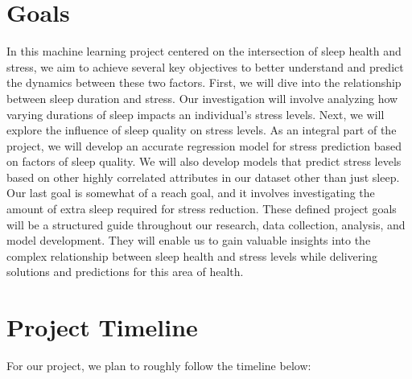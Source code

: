 \documentclass[11pt, letterpaper]{article}
\begin{document}
    \section*{Goals}
    In this machine learning project centered on the intersection of sleep health and 
    stress, we aim to achieve several key objectives to better understand and predict 
    the dynamics between these two factors. First, we will dive into the relationship 
    between sleep duration and stress. Our investigation will involve analyzing how 
    varying durations of sleep impacts an individual's stress levels. Next, we will 
    explore the influence of sleep quality on stress levels. As an integral part of the 
    project, we will develop an accurate regression model for stress prediction based 
    on factors of sleep quality. We will also develop models that predict stress levels 
    based on other highly correlated attributes in our dataset other than just sleep.
    Our last goal is somewhat of a reach goal, and it involves investigating the amount 
    of extra sleep required for stress reduction. These defined project goals will be a 
    structured guide throughout our research, data collection, analysis, and model 
    development. They will enable us to gain valuable insights into the complex 
    relationship between sleep health and stress levels while delivering solutions and 
    predictions for this area of health.

    \newpage

    \section*{Project Timeline}
    For our project, we plan to roughly follow the timeline below:
    
\end{document}
